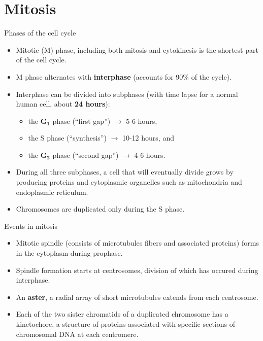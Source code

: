 \documentclass[11pt,ignorenonframetext,aspectratio=169]{beamer}
\providecommand{\tightlist}{%
  \setlength{\itemsep}{0pt}\setlength{\parskip}{0pt}}
\begin{document}
\hypertarget{mitosis}{%
\section{Mitosis}\label{mitosis}}

\begin{frame}{Phases of the cell cycle}
\protect\hypertarget{phases-of-the-cell-cycle}{}
\begin{itemize}
\tightlist
\item
  Mitotic (M) phase, including both mitosis and cytokinesis is the
  shortest part of the cell cycle.
\item
  M phase alternates with \textbf{interphase} (accounts for 90\% of the
  cycle).
\item
  Interphase can be divided into subphases (with time lapse for a normal
  human cell, about \textbf{24 hours}):

  \begin{itemize}
  \tightlist
  \item
    the \(\mathbf{G_1}\) phase (``first gap'') \(\longrightarrow\) 5-6
    hours,
  \item
    the S phase (``synthesis'') \(\longrightarrow\) 10-12 hours, and
  \item
    the \(\mathbf{G_2}\) phase (``second gap'') \(\longrightarrow\) 4-6
    hours.
  \end{itemize}
\item
  During all three subphases, a cell that will eventually divide grows
  by producing proteins and cytoplasmic organelles such as mitochondria
  and endoplasmic reticulum.
\item
  Chromosomes are duplicated only during the S phase.
\end{itemize}
\end{frame}

\begin{frame}{Events in mitosis}
\protect\hypertarget{events-in-mitosis}{}
\begin{itemize}
\tightlist
\item
  Mitotic spindle (consists of microtubules fibers and associated
  proteins) forms in the cytoplasm during prophase.
\item
  Spindle formation starts at centrosomes, division of which has occured
  during interphase.
\item
  An \textbf{aster}, a radial array of short microtubules extends from
  each centrosome.
\item
  Each of the two sister chromatids of a duplicated chromosome has a
  kinetochore, a structure of proteins associated with specific sections
  of chromosomal DNA at each centromere.
\end{itemize}
\end{frame}
\end{document}
